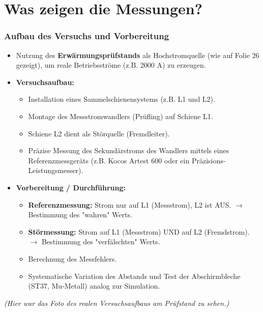 \section*{Was zeigen die Messungen?}

\begin{frame}
    \frametitle{Aufbau des Versuchs und Vorbereitung}
    \begin{itemize}
        \item Nutzung des \textbf{Erwärmungsprüfstands} als Hochstromquelle (wie auf Folie 26 gezeigt), um reale Betriebsströme (z.B. 2000 A) zu erzeugen.
        \item \textbf{Versuchsaufbau:}
              \begin{itemize}
                  \item Installation eines Sammelschienensystems (z.B. L1 und L2).
                  \item Montage des Messstromwandlers (Prüfling) auf Schiene L1.
                  \item Schiene L2 dient als Störquelle (Fremdleiter).
                  \item Präzise Messung des Sekundärstroms des Wandlers mittels eines Referenzmessgeräts (z.B. Kocos Artest 600 oder ein Präzisions-Leistungsmesser).
              \end{itemize}
        \item \textbf{Vorbereitung / Durchführung:}
              \begin{itemize}
                  \item \textbf{Referenzmessung:} Strom nur auf L1 (Messstrom), L2 ist AUS. $\rightarrow$ Bestimmung des "wahren" Werts.
                  \item \textbf{Störmessung:} Strom auf L1 (Messstrom) UND auf L2 (Fremdstrom). $\rightarrow$ Bestimmung des "verfälschten" Werts.
                  \item Berechnung des Messfehlers.
                  \item Systematische Variation des Abstands und Test der Abschirmbleche (ST37, Mu-Metall) analog zur Simulation.
              \end{itemize}
    \end{itemize}
    \begin{center}
        \textit{(Hier war das Foto des realen Versuchsaufbaus am Prüfstand zu sehen.)}
    \end{center}
\end{frame}

